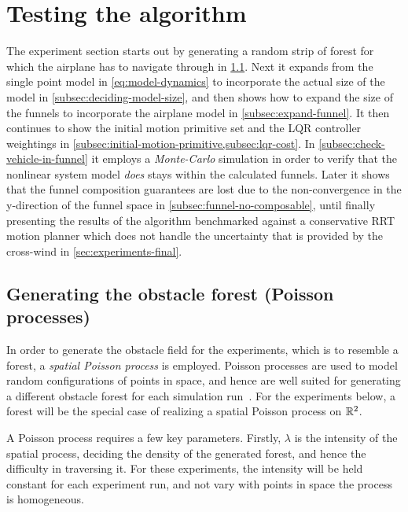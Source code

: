 \section{Testing the \rrtfunnel{} algorithm}

The experiment section starts out by generating a random strip of forest for
which the airplane has to navigate through in \cref{sec:Poisson-Process}. Next
it expands from the single point model in \cref{eq:model-dynamics} to
incorporate the actual size of the model in \cref{subsec:deciding-model-size},
and then shows how to expand the size of the funnels to incorporate the airplane
model in \cref{subsec:expand-funnel}. It then continues to show the initial
motion primitive set and the \ac{LQR} controller weightings in
\cref{subsec:initial-motion-primitive,subsec:lqr-cost}. In
\cref{subsec:check-vehicle-in-funnel} it employs a \textit{Monte-Carlo}
simulation in order to verify that the nonlinear system model \textit{does}
stays within the calculated funnels. Later it shows that the funnel composition
guarantees are lost due to the non-convergence in the y-direction of the funnel
space in \cref{subsec:funnel-no-composable}, until finally presenting the
results of the \rrtfunnel{} algorithm benchmarked against a conservative
\ac{RRT} motion planner which does not handle the uncertainty that is provided
by the cross-wind in \cref{sec:experiments-final}.

\subsection{Generating the obstacle forest (Poisson processes)}
\label{sec:Poisson-Process}

In order to generate the obstacle field for the experiments, which is to
resemble a forest, a \textit{spatial Poisson process} is employed. Poisson
processes are used to model random configurations of points in space, and hence
are well suited for generating a different obstacle forest for each simulation
run~\cite{Kroese_2014}. For the experiments below, a forest will be the special
case of realizing a spatial Poisson process on \(\mathbb{R}^2\).

A Poisson process requires a few key parameters. Firstly, \(\lambda\) is the
intensity of the spatial process, deciding the density of the generated forest,
and hence the difficulty in traversing it. For these experiments, the intensity
will be held constant for each experiment run, and not vary with points in space
\ie the process is homogeneous.

